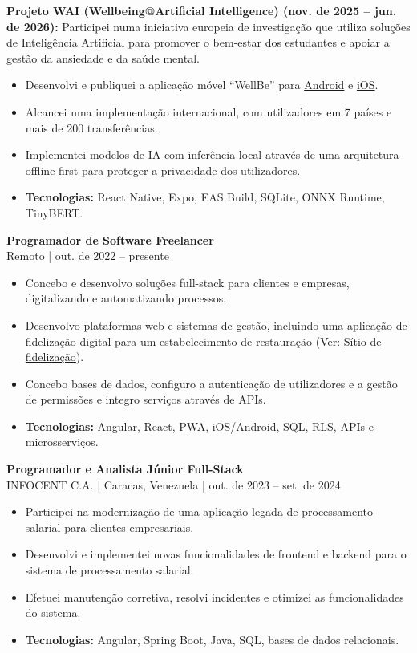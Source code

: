 \documentclass[10pt,a4paper]{article}
\begin{document}
\vspace{5pt}
\textbf{Projeto WAI (Wellbeing@Artificial Intelligence) (nov. de 2025 -- jun. de 2026):} Participei numa iniciativa europeia de investigação que utiliza soluções de Inteligência Artificial para promover o bem-estar dos estudantes e apoiar a gestão da ansiedade e da saúde mental.
\begin{itemize}
    \item Desenvolvi e publiquei a aplicação móvel ``WellBe'' para \href{https://play.google.com/store/apps/details?id=com.caloale.waiv1\&hl=en_US}{Android} e \href{https://apps.apple.com/ie/app/wellbe-journaling-app/id6758772082}{iOS}.
    \item Alcancei uma implementação internacional, com utilizadores em 7 países e mais de 200 transferências.
    \item Implementei modelos de IA com inferência local através de uma arquitetura offline-first para proteger a privacidade dos utilizadores.
    \item \textbf{Tecnologias:} React Native, Expo, EAS Build, SQLite, ONNX Runtime, TinyBERT.
\end{itemize}

\par\addvspace{\baselineskip}
\textbf{\large Programador de Software Freelancer}\\
Remoto | out. de 2022 -- presente
\begin{itemize}
    \item Concebo e desenvolvo soluções full-stack para clientes e empresas, digitalizando e automatizando processos.
    \item Desenvolvo plataformas web e sistemas de gestão, incluindo uma aplicação de fidelização digital para um estabelecimento de restauração (Ver: \href{https://avenidakebab.com/}{Sítio de fidelização}).
    \item Concebo bases de dados, configuro a autenticação de utilizadores e a gestão de permissões e integro serviços através de APIs.
    \item \textbf{Tecnologias:} Angular, React, PWA, iOS/Android, SQL, RLS, APIs e microsserviços.
\end{itemize}

\par\addvspace{\baselineskip}
\textbf{\large Programador e Analista Júnior Full-Stack}\\
INFOCENT C.A. | Caracas, Venezuela | out. de 2023 -- set. de 2024
\begin{itemize}
    \item Participei na modernização de uma aplicação legada de processamento salarial para clientes empresariais.
    \item Desenvolvi e implementei novas funcionalidades de frontend e backend para o sistema de processamento salarial.
    \item Efetuei manutenção corretiva, resolvi incidentes e otimizei as funcionalidades do sistema.
    \item \textbf{Tecnologias:} Angular, Spring Boot, Java, SQL, bases de dados relacionais.
\end{itemize}
\end{document}
